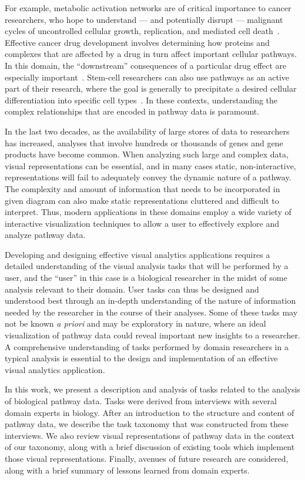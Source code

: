 \documentclass[twocolumn]{bmcart}%
\begin{document}
For example, metabolic activation networks are of critical importance to cancer researchers, who hope to understand --- and potentially disrupt --- malignant cycles of uncontrolled cellular growth, replication, and mediated cell death~\cite{cairns2011regulation}.
Effective cancer drug development involves determining how proteins and complexes that are affected by a drug in turn affect important cellular pathways.
In this domain, the ``downstream'' consequences of a particular drug effect are especially important~\cite{luo2003targeting}.
Stem-cell researchers can also use pathways as an active part of their research, where the goal is generally to precipitate a desired cellular differentiation into specific cell types~\cite{reya2001stem}.
In these contexts, understanding the complex relationships that are encoded in pathway data is paramount.

In the last two decades, as the availability of large stores of data to researchers has increased, analyses that involve hundreds or thousands of genes and gene products have become common.
When analyzing such large and complex data, visual representations can be essential, and in many cases static, non-interactive, representations will fail to adequately convey the dynamic nature of a pathway.
The complexity and amount of information that needs to be incorporated in given diagram can also make static representations cluttered and difficult to interpret.
Thus, modern applications in these domains employ a wide variety of interactive visualization techniques to allow a user to effectively explore and analyze pathway data.

Developing and designing effective visual analytics applications requires a detailed understanding of the visual analysis tasks that will be performed by a user, and the ``user'' in this case is a biological researcher in the midst of some analysis relevant to their domain.
User tasks can thus be designed and understood best through an in-depth understanding of the nature of information needed by the researcher in the course of their analyses.
Some of these tasks may not be known \emph{a priori} and may be exploratory in nature, where an ideal visualization of pathway data could reveal important new insights to a researcher.
A comprehensive understanding of tasks performed by domain researchers in a typical analysis is essential to the design and implementation of an effective visual analytics application.

In this work, we present a description and analysis of tasks related to the analysis of biological pathway data.
Tasks were derived from interviews with several domain experts in biology.
After an introduction to the structure and content of pathway data, we describe the task taxonomy that was constructed from these interviews.
We also review visual representations of pathway data in the context of our taxonomy, along with a brief discussion of existing tools which implement those visual representations.
Finally, avenues of future research are considered, along with a brief summary of lessons learned from domain experts.
\end{document}
